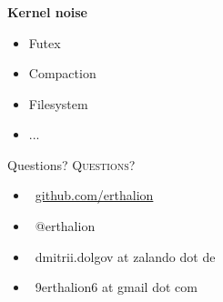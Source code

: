 \documentclass[usenames,dvipsnames, 18pt, compress, aspectratio=169]{beamer}
\def\twitter{{\FA \faTwitter}}
\def\github{{\FA \faGithub}}
\def\email{{\FA \faEnvelope}}
\begin{document}
\begin{frame}[fragile]{}
    \frametitle{}
    \begin{center}
        \textbf{Kernel noise}

        \begin{itemize}[]
			\item Futex
            \item Compaction
            \item Filesystem
            \item ...
        \end{itemize}

    \end{center}
\end{frame}

\fontsize{18pt}{18}\selectfont
\begin{frame}
  \vspace*{2.5cm}
  \begin{minipage}[b][\paperheight]{\textwidth}
  \begin{center}

      \linespread{1.0}%
      \if@noSmallCapitals%
        Questions?
      \else%
        \scshape{\color{black} Questions?}%
      \fi%
      \vspace*{0.3em}

      \fontsize{13pt}{14}\selectfont
        \begin{itemize}[label={}]
            \item {\color{black} \github\ \href{github.com/erthalion}
                                               {\color{black}github.com/erthalion}}
            \item {\color{black} \twitter\ @erthalion}
            \item {\color{black} \email\ dmitrii.dolgov at zalando dot de}
            \item {\color{black} \email\ 9erthalion6 at gmail dot com}
        \end{itemize}
      \vspace*{2.5em}%

    \vfill
    \vspace*{2em}
  \end{center}
  \end{minipage}

\end{frame}
\end{document}
